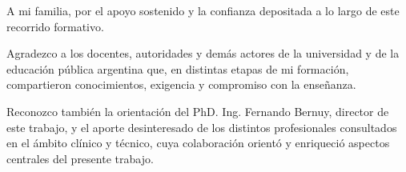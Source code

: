 \documentclass[
    11pt,
    spanish,
    singlespacing,
    parskip,
    headsepline,
    bookmarks=true,
    unicode=true,
    pdftoolbar=true,
    pdfmenubar=true,
    pdffitwindow=false,
    colorlinks=true,
    linkcolor=blue,
    citecolor=blue,
    urlcolor=blue
]{MastersDoctoralThesis}
\begin{document}



\frontmatter %
\pagestyle{plain} %


\begin{abstract}
\addchaptertocentry{\abstractname} %
Este trabajo presenta el desarrollo de un sistema de software que analiza grabaciones de video de personas que realizan ejercicios estandarizados de evaluación motora en pacientes con Parkinson. La solución produce medidas cuantitativas del movimiento para complementar la valoración clínica con información objetiva y trazable. La enfermedad de Parkinson altera el control motor y suele evaluarse en consulta mediante la observación de esos ejercicios, lo que puede introducir subjetividad y dificultar el seguimiento fino de la evolución.

Para su implementación, se aplicaron contenidos de la maestría en inteligencia artificial, en particular visión por computadora, aprendizaje automático con modelos preentrenados, ingeniería de software y operaciones de aprendizaje automático.
\end{abstract}


\begin{acknowledgements}
\vspace{1.5cm}
A mi familia, por el apoyo sostenido y la confianza depositada a lo largo de este recorrido formativo.

Agradezco a los docentes, autoridades y demás actores de la universidad y de la educación pública argentina que, en distintas etapas de mi formación, compartieron conocimientos, exigencia y compromiso con la enseñanza.

Reconozco también la orientación del PhD. Ing. Fernando Bernuy, director de este trabajo, y el aporte desinteresado de los distintos profesionales consultados en el ámbito clínico y técnico, cuya colaboración orientó y enriqueció aspectos centrales del presente trabajo.
\end{acknowledgements}
\end{document}
